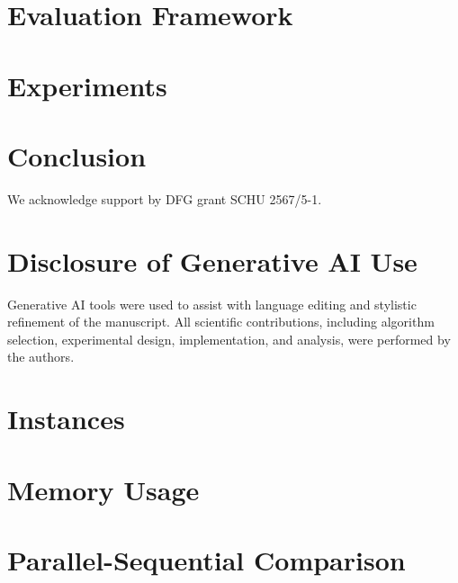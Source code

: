 \documentclass[sigconf,review]{acmart}
\begin{document}
\section{Evaluation Framework}\label{sec:evaluation}


\section{Experiments}\label{sec:experiments}


\vspace{-0.5em}

\section{Conclusion}\label{sec:conclusion}


\begin{acks}
  We acknowledge support by DFG grant SCHU 2567/5-1.
  \section*{Disclosure of Generative AI Use}
  Generative AI tools were used to assist with language editing and stylistic refinement of the manuscript. All scientific contributions, including algorithm selection, experimental design, implementation, and analysis, were performed by the authors.
\end{acks}






\appendix

\setcounter{topnumber}{5}
\setcounter{bottomnumber}{5}
\setcounter{totalnumber}{10}
\renewcommand{\topfraction}{0.9}
\renewcommand{\bottomfraction}{0.8}
\renewcommand{\textfraction}{0.05}
\renewcommand{\floatpagefraction}{0.8}

\section{Instances}
\label{sec:instances}
\FloatBarrier



\vfill
\clearpage

\onecolumn

\section{Memory Usage}
\label{sec:memory}




\section{Parallel-Sequential Comparison}
\label{sec:par-seq}



\end{document}
